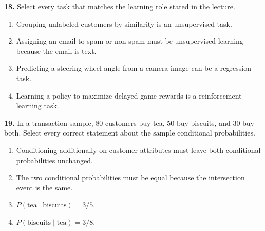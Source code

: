 \documentclass[11pt,a4paper]{article}
\begin{document}
\par\noindent\begin{minipage}{\linewidth}
\textbf{18.} Select every task that matches the learning role stated in the lecture.
\begin{enumerate}[label=(\Alph*),leftmargin=8mm,itemsep=2pt,topsep=2pt]
\item Grouping unlabeled customers by similarity is an unsupervised task.
\item Assigning an email to spam or non-spam must be unsupervised learning because the email is text.
\item Predicting a steering wheel angle from a camera image can be a regression task.
\item Learning a policy to maximize delayed game rewards is a reinforcement learning task.
\end{enumerate}

\end{minipage}\par\vspace{3mm}
\par\noindent\begin{minipage}{\linewidth}
\textbf{19.} In a transaction sample, 80 customers buy tea, 50 buy biscuits, and 30 buy both. Select every correct statement about the sample conditional probabilities.
\begin{enumerate}[label=(\Alph*),leftmargin=8mm,itemsep=2pt,topsep=2pt]
\item Conditioning additionally on customer attributes must leave both conditional probabilities unchanged.
\item The two conditional probabilities must be equal because the intersection event is the same.
\item \(P(\text{tea}\mid\text{biscuits})=3/5\).
\item \(P(\text{biscuits}\mid\text{tea})=3/8\).
\end{enumerate}

\end{minipage}\par\vspace{3mm}
\end{document}
